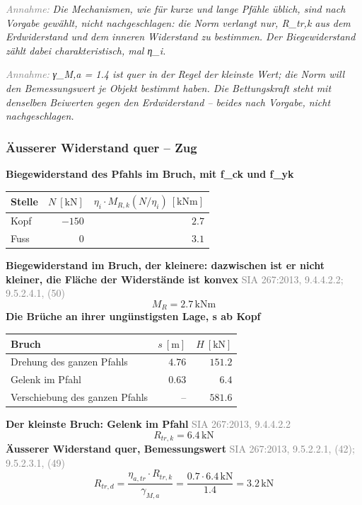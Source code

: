 \documentclass[11pt,a4paper]{article}
\newcommand{\normref}[1]{{\small\textcolor{gray}{#1}}}
\newcommand{\hinweis}[2]{\par\noindent\textcolor{gray}{\textit{#1:}} \textit{#2}\par}
\begin{document}
\hinweis{Annahme}{Die Mechanismen, wie für kurze und lange Pfähle üblich, sind nach Vorgabe gewählt, nicht nachgeschlagen: die Norm verlangt nur, R\_tr,k aus dem Erdwiderstand und dem inneren Widerstand zu bestimmen. Der Biegewiderstand zählt dabei charakteristisch, mal η\_i.}
\hinweis{Annahme}{γ\_M,a = 1.4 ist quer in der Regel der kleinste Wert; die Norm will den Bemessungswert je Objekt bestimmt haben. Die Bettungskraft steht mit denselben Beiwerten gegen den Erdwiderstand -- beides nach Vorgabe, nicht nachgeschlagen.}
\subsubsection{Äusserer Widerstand quer – Zug}
\noindent\textbf{Biegewiderstand des Pfahls im Bruch, mit f\_ck und f\_yk}
\begin{longtable}{lrr}
\hline
Stelle & $N\ [\mathrm{kN}]$ & $\eta_i \cdot M_{R,k}(N / \eta_i)\ [\mathrm{kNm}]$ \\
\hline
\endhead
Kopf & $-150$ & $2.7$ \\
Fuss & $0$ & $3.1$ \\
\hline
\end{longtable}
\noindent\textbf{Biegewiderstand im Bruch, der kleinere: dazwischen ist er nicht kleiner, die Fläche der Widerstände ist konvex} \hfill \normref{SIA 267:2013, 9.4.4.2.2; 9.5.2.4.1, (50)}
\begin{equation*}
M_R = 2.7\,\mathrm{kNm}
\end{equation*}
\noindent\textbf{Die Brüche an ihrer ungünstigsten Lage, s ab Kopf}
\begin{longtable}{lrr}
\hline
Bruch & $s\ [\mathrm{m}]$ & $H\ [\mathrm{kN}]$ \\
\hline
\endhead
Drehung des ganzen Pfahls & $4.76$ & $151.2$ \\
Gelenk im Pfahl & $0.63$ & $6.4$ \\
Verschiebung des ganzen Pfahls & – & $581.6$ \\
\hline
\end{longtable}
\noindent\textbf{Der kleinste Bruch: Gelenk im Pfahl} \hfill \normref{SIA 267:2013, 9.4.4.2.2}
\begin{equation*}
R_{tr,k} = 6.4\,\mathrm{kN}
\end{equation*}
\noindent\textbf{Äusserer Widerstand quer, Bemessungswert} \hfill \normref{SIA 267:2013, 9.5.2.2.1, (42); 9.5.2.3.1, (49)}
\begin{equation*}
R_{tr,d} = \frac{\eta_{a,tr} \cdot R_{tr,k}}{\gamma_{M,a}} = \frac{0.7 \cdot 6.4\,\mathrm{kN}}{1.4} = 3.2\,\mathrm{kN}
\end{equation*}
\end{document}
